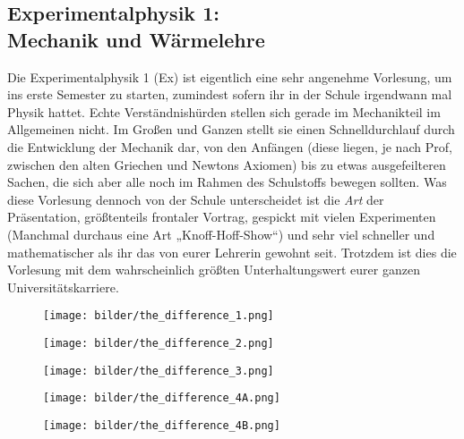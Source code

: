 \subsection{Experimentalphysik 1: \\Mechanik und Wärmelehre}
\label{ex1}
Die Experimentalphysik 1 (\gls{Ex}) ist eigentlich eine sehr angenehme Vorlesung, um ins erste Semester zu starten, zumindest sofern ihr in der Schule irgendwann mal Physik hattet. Echte Verständnishürden stellen sich gerade im Mechanikteil im Allgemeinen nicht. Im Großen und Ganzen stellt sie einen Schnelldurchlauf durch die Entwicklung der Mechanik dar, von den Anfängen (diese liegen, je nach Prof, zwischen den alten Griechen und Newtons Axiomen) bis zu etwas ausgefeilteren Sachen, die sich aber alle noch im Rahmen des Schulstoffs bewegen sollten. Was diese Vorlesung dennoch von der Schule unterscheidet ist die \emph{Art} der Präsentation, größtenteils frontaler Vortrag, gespickt mit vielen Experimenten (Manchmal durchaus eine Art „Knoff-Hoff-Show“) und sehr viel schneller und mathematischer als ihr das von eurer Lehrerin gewohnt seit. Trotzdem ist dies die Vorlesung mit dem wahrscheinlich größten Unterhaltungswert eurer ganzen Universitätskarriere.

\begin{figure*}[b]
    \centering
    \begin{subfigure}[b]{.18\textwidth}
    \texttt{[image: bilder/the\_difference\_1.png]}	    
    \end{subfigure}
    \begin{subfigure}[b]{.18\textwidth}
    \texttt{[image: bilder/the\_difference\_2.png]}
    \end{subfigure}
    \begin{subfigure}[b]{.18\textwidth}
    \texttt{[image: bilder/the\_difference\_3.png]}
    \end{subfigure}
    \begin{subfigure}[b]{.18\textwidth}
    \texttt{[image: bilder/the\_difference\_4A.png]}
    \end{subfigure}
    \begin{subfigure}[b]{.18\textwidth}
    \texttt{[image: bilder/the\_difference\_4B.png]}
    \end{subfigure}
\end{figure*}

